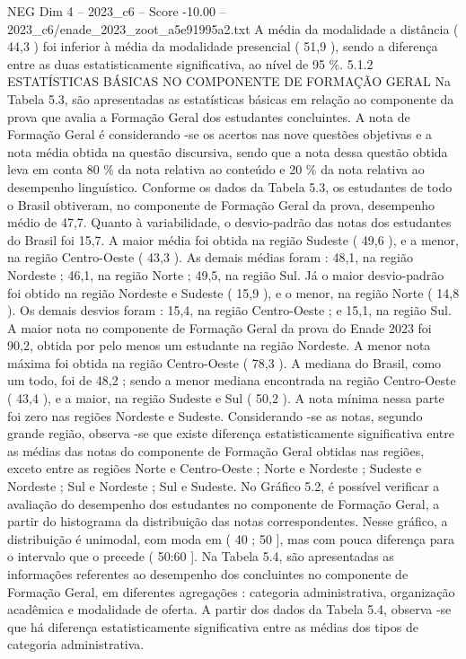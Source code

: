 \begin{textsample}{NEG Dim 4 – 2023\_c6 – Score -10.00 – 2023\_c6/enade\_2023\_zoot\_a5e91995a2.txt}
A média da modalidade a distância ( 44,3 ) foi inferior à média da modalidade presencial ( 51,9 ), sendo a diferença entre as duas estatisticamente significativa, ao nível de 95 \%. 5.1.2 ESTATÍSTICAS BÁSICAS NO COMPONENTE DE FORMAÇÃO GERAL Na Tabela 5.3, são apresentadas as estatísticas básicas em relação ao componente da prova que avalia a Formação Geral dos estudantes concluintes.
A nota de Formação Geral é considerando -se os acertos nas nove questões objetivas e a nota média obtida na questão discursiva, sendo que a nota dessa questão obtida leva em conta 80 \% da nota relativa ao conteúdo e 20 \% da nota relativa ao desempenho linguístico.
Conforme os dados da Tabela 5.3, os estudantes de todo o Brasil obtiveram, no componente de Formação Geral da prova, desempenho médio de 47,7.
Quanto à variabilidade, o desvio-padrão das notas dos estudantes do Brasil foi 15,7.
A maior média foi obtida na região Sudeste ( 49,6 ), e a menor, na região Centro-Oeste ( 43,3 ).
As demais médias foram : 48,1, na região Nordeste ; 46,1, na região Norte ; 49,5, na região Sul.
Já o maior desvio-padrão foi obtido na região Nordeste e Sudeste ( 15,9 ), e o menor, na região Norte ( 14,8 ).
Os demais desvios foram : 15,4, na região Centro-Oeste ; e 15,1, na região Sul.
A maior nota no componente de Formação Geral da prova do Enade 2023 foi 90,2, obtida por pelo menos um estudante na região Nordeste.
A menor nota máxima foi obtida na região Centro-Oeste ( 78,3 ).
A mediana do Brasil, como um todo, foi de 48,2 ; sendo a menor mediana encontrada na região Centro-Oeste ( 43,4 ), e a maior, na região Sudeste e Sul ( 50,2 ).
A nota mínima nessa parte foi zero nas regiões Nordeste e Sudeste.
Considerando -se as notas, segundo grande região, observa -se que existe diferença estatisticamente significativa entre as médias das notas do componente de Formação Geral obtidas nas regiões, exceto entre as regiões Norte e Centro-Oeste ; Norte e Nordeste ; Sudeste e Nordeste ; Sul e Nordeste ; Sul e Sudeste.
No Gráfico 5.2, é possível verificar a avaliação do desempenho dos estudantes no componente de Formação Geral, a partir do histograma da distribuição das notas correspondentes.
Nesse gráfico, a distribuição é unimodal, com moda em ( 40 ; 50 ], mas com pouca diferença para o intervalo que o precede ( 50:60 ].
Na Tabela 5.4, são apresentadas as informações referentes ao desempenho dos concluintes no componente de Formação Geral, em diferentes agregações : categoria administrativa, organização acadêmica e modalidade de oferta.
A partir dos dados da Tabela 5.4, observa -se que há diferença estatisticamente significativa entre as médias dos tipos de categoria administrativa.

\end{textsample}
